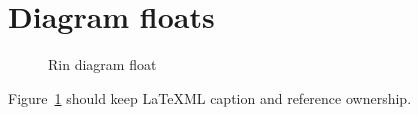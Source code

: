\documentclass{article}
\begin{document}
\section{Diagram floats}
\begin{figure}
\centering
\begin{minipage}{0.8\linewidth}
\centering
{}
\end{minipage}
\caption{Rin diagram float}
\label{fig:rin-diagram-float}
\end{figure}

Figure~\ref{fig:rin-diagram-float} should keep LaTeXML caption and reference ownership.
\end{document}
